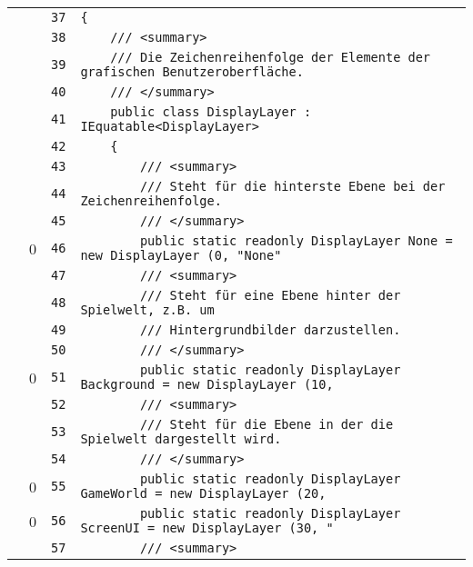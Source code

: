\documentclass[a4paper,10pt]{article}
\begin{document}
\begin{longtable}[l]{lrrl}
\cellcolor{gray} &  & \verb~37~ & \verb~{~\\
\cellcolor{gray} &  & \verb~38~ & \verb~    /// <summary>~\\
\cellcolor{gray} &  & \verb~39~ & \verb~    /// Die Zeichenreihenfolge der Elemente der grafischen Benutzeroberfläche.~\\
\cellcolor{gray} &  & \verb~40~ & \verb~    /// </summary>~\\
\cellcolor{gray} &  & \verb~41~ & \verb~    public class DisplayLayer : IEquatable<DisplayLayer>~\\
\cellcolor{gray} &  & \verb~42~ & \verb~    {~\\
\cellcolor{gray} &  & \verb~43~ & \verb~        /// <summary>~\\
\cellcolor{gray} &  & \verb~44~ & \verb~        /// Steht für die hinterste Ebene bei der Zeichenreihenfolge.~\\
\cellcolor{gray} &  & \verb~45~ & \verb~        /// </summary>~\\
\cellcolor{red} & 0 & \verb~46~ & \verb~        public static readonly DisplayLayer None = new DisplayLayer (0, "None"~\\
\cellcolor{gray} &  & \verb~47~ & \verb~        /// <summary>~\\
\cellcolor{gray} &  & \verb~48~ & \verb~        /// Steht für eine Ebene hinter der Spielwelt, z.B. um~\\
\cellcolor{gray} &  & \verb~49~ & \verb~        /// Hintergrundbilder darzustellen.~\\
\cellcolor{gray} &  & \verb~50~ & \verb~        /// </summary>~\\
\cellcolor{red} & 0 & \verb~51~ & \verb~        public static readonly DisplayLayer Background = new DisplayLayer (10,~\\
\cellcolor{gray} &  & \verb~52~ & \verb~        /// <summary>~\\
\cellcolor{gray} &  & \verb~53~ & \verb~        /// Steht für die Ebene in der die Spielwelt dargestellt wird.~\\
\cellcolor{gray} &  & \verb~54~ & \verb~        /// </summary>~\\
\cellcolor{red} & 0 & \verb~55~ & \verb~        public static readonly DisplayLayer GameWorld = new DisplayLayer (20, ~\\
\cellcolor{red} & 0 & \verb~56~ & \verb~        public static readonly DisplayLayer ScreenUI = new DisplayLayer (30, "~\\
\cellcolor{gray} &  & \verb~57~ & \verb~        /// <summary>~\\

\end{longtable}
\end{document}
